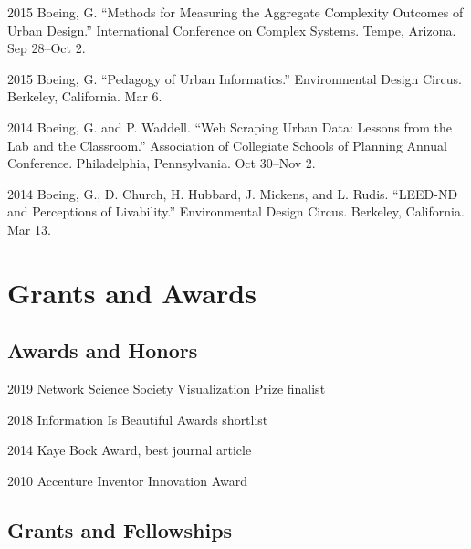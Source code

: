 \documentclass[12pt,letterpaper]{report}
\begin{document}
\begin{tablist}
        \item[2015] \tab Boeing, G. \enquote{Methods for Measuring the Aggregate Complexity Outcomes of Urban Design.} International Conference on Complex Systems. Tempe, Arizona. Sep 28--Oct 2.

        \item[2015] \tab Boeing, G. \enquote{Pedagogy of Urban Informatics.} Environmental Design Circus. Berkeley, California. Mar 6.

        \item[2014] \tab Boeing, G. and P. Waddell. \enquote{Web Scraping Urban Data: Lessons from the Lab and the Classroom.} Association of Collegiate Schools of Planning Annual Conference. Philadelphia, Pennsylvania. Oct 30--Nov 2.

        \item[2014] \tab Boeing, G., D. Church, H. Hubbard, J. Mickens, and L. Rudis. \enquote{LEED-ND and Perceptions of Livability.} Environmental Design Circus. Berkeley, California. Mar 13.

    \end{tablist}



    \section*{Grants and Awards}

    \subsection*{Awards and Honors}

    \begin{tablist}

        \item[2019] \tab Network Science Society Visualization Prize finalist

        \item[2018] \tab Information Is Beautiful Awards shortlist

        \item[2014] \tab Kaye Bock Award, best journal article

        \item[2010] \tab Accenture Inventor Innovation Award

    \end{tablist}

    \subsection*{Grants and Fellowships}
\end{document}
